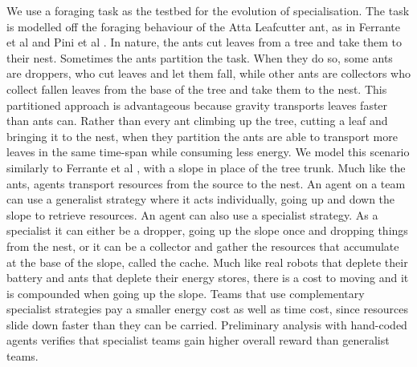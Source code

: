 \documentclass[12pt]{article}  %
\begin{document}
We use a foraging task as the testbed for the evolution of specialisation.
The task is modelled off the foraging behaviour of the Atta Leafcutter ant, as in Ferrante et al \cite{ferrante:PLOS_CB:2015} and Pini et al \cite{pini:Swarm_Intelligence:2011; pini:ICSI:2012}.
In nature, the ants cut leaves from a tree and take them to their nest. 
Sometimes the ants partition the task. 
When they do so, some ants are droppers, who cut leaves and let them fall, while other ants are collectors who collect fallen leaves from the base of the tree and take them to the nest.
This partitioned approach is advantageous because gravity transports leaves faster than ants can.
Rather than every ant climbing up the tree, cutting a leaf and bringing it to the nest, when they partition the ants are able to transport more leaves in the same time-span while consuming less energy.
We model this scenario similarly to Ferrante et al \cite{ferrante:PLOS_CB:2015}, with a slope in place of the tree trunk.
Much like the ants, agents transport resources from the source to the nest.
An agent on a team can use a generalist strategy where it acts individually, going up and down the slope to retrieve resources.
An agent can also use a specialist strategy. 
As a specialist it can either be a dropper, going up the slope once and dropping things from the nest, or it can be a collector and gather the resources that accumulate at the base of the slope, called the cache.
Much like real robots that deplete their battery and ants that deplete their energy stores, there is a cost to moving and it is compounded when going up the slope. 
Teams that use complementary specialist strategies pay a smaller energy cost as well as time cost, since resources slide down faster than they can be carried. 
Preliminary analysis with hand-coded agents verifies that specialist teams gain higher overall reward than generalist teams.\\
\end{document}
